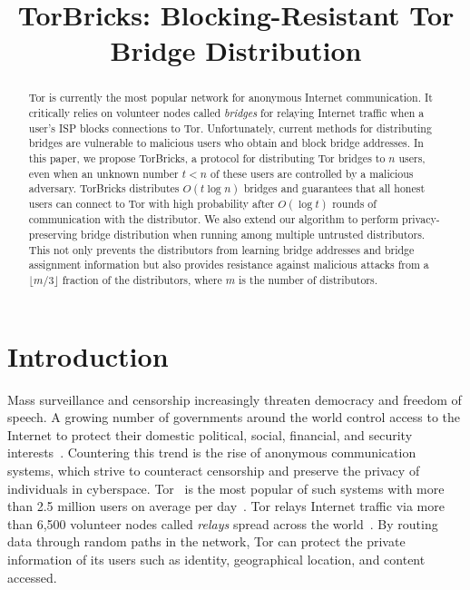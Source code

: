 \documentclass[letterpaper,twocolumn,10pt]{article}
\title{\fontsize{15}{15}\selectfont TorBricks: Blocking-Resistant Tor Bridge Distribution}
\newcommand{\bricks}{}
\def\bricks/{\mbox{TorBricks}}
\begin{document}
\maketitle

\begin{abstract}
	Tor is currently the most popular network for anonymous Internet communication. It critically relies on volunteer nodes called \emph{bridges} for relaying Internet traffic when a user's ISP blocks connections to Tor. 
	Unfortunately, current methods for distributing bridges are vulnerable to malicious users who obtain and block bridge addresses.
	In this paper, we propose \bricks/, a protocol for distributing Tor bridges to $n$ users, even when an unknown number ${t < n}$ of these users are controlled by a malicious adversary. \bricks/ distributes $O(t\log{n})$ bridges and guarantees that all honest users can connect to Tor with high probability after $O(\log{t})$ rounds of communication with the distributor. %
	\newline We also extend our algorithm to perform privacy-preserving bridge distribution when running among multiple untrusted distributors. This not only prevents the distributors from learning bridge addresses and bridge assignment information but also provides resistance against malicious attacks from a $\lfloor m/3 \rfloor$ fraction of the distributors, where $m$ is the number of distributors.
\end{abstract}

\section{Introduction}
Mass surveillance and censorship increasingly threaten democracy and freedom of speech. A growing number of governments around the world control access to the Internet to protect their domestic political, social, financial, and security interests~\cite{Turner:2016:Surveillance,Rushe:2012:Censorship}. Countering this trend is the rise of anonymous communication systems, which strive to counteract censorship and preserve the privacy of individuals in cyberspace. Tor~\cite{dingledine:2004} is the most popular of such systems with more than 2.5 million users on average per day~\cite{Tor:Users}. Tor relays Internet traffic via more than 6,500 volunteer nodes called \emph{relays} spread across the world~\cite{Tor:Relays}. By routing data through random paths in the network, Tor can protect the private information of its users such as identity, geographical location, and content accessed.
\end{document}
